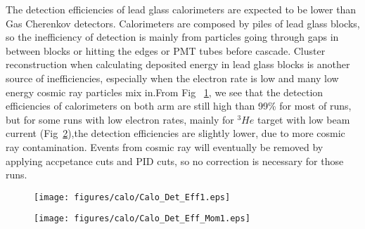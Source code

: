 The detection efficiencies of lead glass calorimeters are expected to be lower than Gas Cherenkov detectors. Calorimeters are composed by piles of lead glass blocks, so the inefficiency of detection is mainly from particles going through gaps in between blocks or hitting the edges or PMT tubes before cascade. Cluster reconstruction when calculating deposited energy in lead glass blocks is another source of inefficiencies, especially when the electron rate is low and many low energy cosmic ray particles mix in.From Fig ~\ref{calo_det_eff}, we see that the detection efficiencies of calorimeters on both arm are still high than 99\% for most of runs, but for some runs with low electron rates, mainly for $^{3}He$ target with low beam current (Fig~\ref{calo_det_eff_mom}),the detection efficiencies are slightly lower, due to more cosmic ray contamination. Events from cosmic ray will eventually be removed by applying accpetance cuts and PID cuts, so no correction is necessary for those runs.  

\begin{figure}[h!]
 \centerline{\texttt{[image: figures/calo/Calo\_Det\_Eff1.eps]}}
 \label{calo_det_eff}
\end{figure}

\begin{figure}[h!]
 \centerline{\texttt{[image: figures/calo/Calo\_Det\_Eff\_Mom1.eps]}}
 \label{calo_det_eff_mom}
\end{figure}